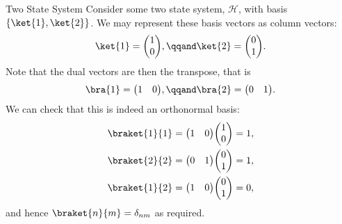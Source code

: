 \documentclass[fleqn]{NotesClass}
\newcommand*{\hilbert}{\mathcal{H}}
\renewenvironment*{vector}{\begin{pmatrix}}{\end{pmatrix}}
\begin{document}
    \begin{exm}{Two State System}{}
        Consider some two state system, \(\hilbert\), with basis \(\{\ket{1}, \ket{2}\}\).
        We may represent these basis vectors as column vectors:
        \begin{equation}
            \ket{1} =
            \begin{vector}
                1\\ 0
            \end{vector}
            , \qqand
            \ket{2} = 
            \begin{vector}
                0\\ 1
            \end{vector}
            .
        \end{equation}
        Note that the dual vectors are then the transpose, that is
        \begin{equation}
            \bra{1} =
            \begin{vector}
                1 & 0
            \end{vector}
            , \qqand
            \bra{2} = 
            \begin{vector}
                0 & 1
            \end{vector}
            .
        \end{equation}
        We can check that this is indeed an orthonormal basis:
        \begin{align}
            \braket{1}{1} &= 
            \begin{vector}
                1 & 0
            \end{vector}
            \begin{vector}
                1\\ 0
            \end{vector}
            =
            1,\\
            \braket{2}{2} &= 
            \begin{vector}
                0 & 1
            \end{vector}
            \begin{vector}
                0\\ 1
            \end{vector}
            =
            1,\\
            \braket{1}{2} &= 
            \begin{vector}
                1 & 0
            \end{vector}
            \begin{vector}
                0\\ 1
            \end{vector}
            =
            0,\\
        \end{align}
        and hence \(\braket{n}{m} = \delta_{nm}\) as required.
        

\end{exm}
\end{document}
